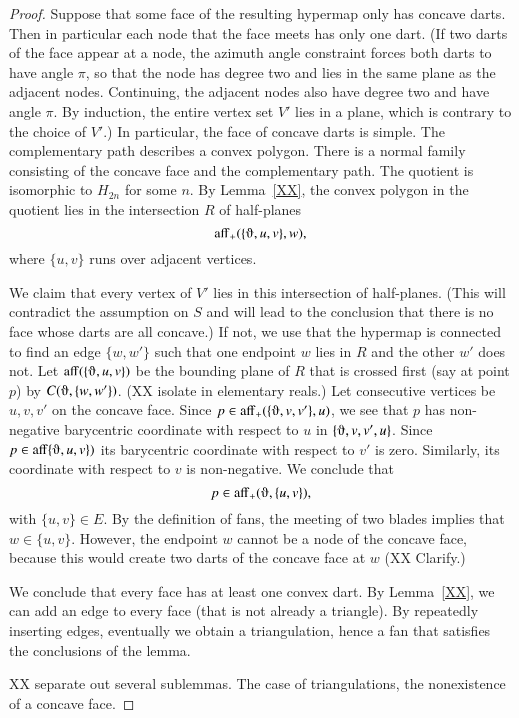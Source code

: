 \begin{proof}
Suppose that some face of the resulting hypermap only has concave darts.  Then
in particular each node that the face meets has only one dart.  (If two darts
of the face appear at a node, the azimuth angle constraint forces both darts to
have angle $\pi$, so that the node has degree two and lies in the same plane
as the adjacent nodes.  Continuing, the adjacent nodes also have degree two and
have angle $\pi$.  By induction, the entire vertex set $V'$ lies in a plane, which
is contrary to the choice of $V'$.)   In particular, the face of concave darts
is simple.   The complementary path describes a convex polygon.  There
is a normal family consisting of the concave face and the complementary path.
The quotient is isomorphic to $H_{2n}$ for some $n$.  By Lemma~\ref{XX}, the
convex polygon in the quotient lies in the intersection $R$ of half-planes
$$
\op{aff}_+(\{\orgn,u,v\},w),
$$
where $\{u,v\}$ runs over adjacent vertices.  

We claim that every vertex of $V'$ lies in this intersection of half-planes.
(This will contradict the assumption on $S$ and will lead to the conclusion that
there is no face whose darts are all concave.)
If not, we use that the hypermap is connected to find an edge $\{w,w'\}$ such
that one endpoint $w$ lies in $R$ and the other $w'$ does not.  
Let $\op{aff}(\{\orgn,u,v\})$ be the bounding plane of $R$ that 
is crossed first (say at point $p$) by
$C(\orgn,\{w,w'\})$.  (XX isolate in elementary reals.)  
Let consecutive vertices be $u,v,v'$ on the concave face.  Since
$p\in \op{aff}_+(\{\orgn,v,v'\},u)$, we see that $p$ has non-negative barycentric
coordinate with respect to $u$ in $\{\orgn,v,v',u\}$.  Since $p\in \op{aff}\{\orgn,u,v\})$
its barycentric coordinate with respect to $v'$ is zero.  Similarly, its
coordinate with respect to $v$ is non-negative.  We conclude that 
  $$p\in \op{aff}_+(\orgn,\{u,v\}),$$
with $\{u,v\}\in E$.  By the definition of fans, the meeting of two
blades implies that $w\in\{u,v\}$.
However, the endpoint $w$ cannot be a node of the concave face, because this would
create two darts of the concave face at $w$ (XX Clarify.)

We conclude that every face has at least one convex dart.  By Lemma~\ref{XX},
we can add an edge to every face (that is not already a triangle).  By repeatedly
inserting edges, eventually we obtain a triangulation, hence a fan
that satisfies the conclusions of the lemma.

XX separate out several sublemmas.  The case of triangulations, the nonexistence
of a concave face.


\end{proof}
